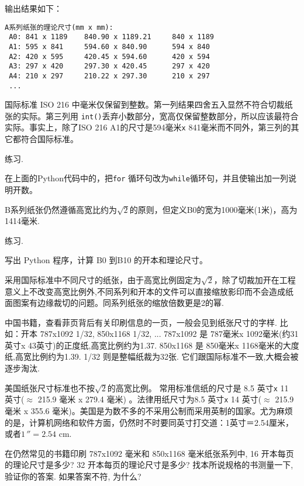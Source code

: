 输出结果如下：
\vspace{.4cm}
\begin{spacing}{0.8}
	\begin{small}
\begin{lstlisting}
A系列纸张的理论尺寸(mm x mm):
 A0: 841 x 1189    840.90 x 1189.21     840 x 1189
 A1: 595 x 841     594.60 x 840.90      594 x 840
 A2: 420 x 595     420.45 x 594.60      420 x 594
 A3: 297 x 420     297.30 x 420.45      297 x 420
 A4: 210 x 297     210.22 x 297.30      210 x 297
 ...

\end{lstlisting}
\end{small}
\end{spacing}
\vspace{.4cm}\label{a_paper_py}
国际标准 ISO 216 中毫米仅保留到整数。第一列结果四舍五入显然不符合切裁纸张的实际。第三列用 \texttt{int()}丢弃小数部分，宽高仅保留整数部分，所以应该最符合实际。事实上，除了ISO 216 A1的尺寸是594毫米\texttt{x}{ }841毫米而不同外，第三列的其它都符合国际标准。

\begin{kaishu}练习.\end{kaishu} 在上面的Python代码中的，把\texttt{for} 循环句改为\texttt{while}循环句，并且使输出加一列说明开数。

B系列纸张仍然遵循高宽比约为$\sqrt{2}$的原则，但定义B0的宽为1000毫米(1米)，高为1414毫米.

\begin{kaishu}练习.\end{kaishu} 写出 Python 程序，计算 B0 到B10 的开本和理论尺寸。 

采用国际标准中不同尺寸的纸张，由于高宽比例固定为$\sqrt{2}$，除了切裁加开在工程意义上不改变高宽比例外,不同系列和开本的文件可以直接缩放影印而不会造成纸面图案有边缘裁切的问题。同系列纸张的缩放倍数更是2的幂.

中国书籍，查看菲页背后有关印刷信息的一页，一般会见到纸张尺寸的字样.
比如：开本 787x1092 1/32, 850x1168 1/32, ... 
787x1092 是 787毫米x{ }1092毫米(约31英寸x{ }43英寸)的正度纸,高宽比例约为1.37.
850x1168 是 850毫米x{ }1168毫米的大度纸,高宽比例约为1.39.
1/32 则是整幅纸裁为32张.
它们跟国际标准不一致,大概会被逐步淘汰.

美国纸张尺寸标准也不按$\sqrt{2}$的高宽比例。 常用标准信纸的尺寸是 8.5 英寸\texttt{x}{ }11 英寸($\approx$ 215.9 毫米 x 279.4 毫米) 。法律用纸尺寸为8.5 英寸\texttt{x}{ }14 英寸($\approx$ 215.9 毫米 x 355.6 毫米)。美国是为数不多的不采用公制而采用英制的国家。尤为麻烦的是，计算机网络和软件方面，仍然时不时要同英寸打交道：1英寸＝2.54厘米，或者$1\,'' = 2.54$ cm.

\begin{Exercises}
	\item 在仍然常见的书籍印刷 787x1092 毫米和 850x1168 毫米纸张系列中, 16 开本每页的理论尺寸是多少? 32 开本每页的理论尺寸是多少? 找本所说规格的书测量一下,验证你的答案. 如果答案不符, 为什么?
\end{Exercises}

